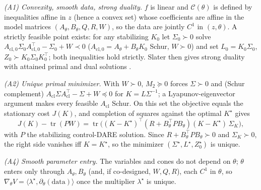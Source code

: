 \documentclass[twocolumn,amsthm]{autart}
\begin{document}
\emph{(A1) Convexity, smooth data, strong duality.} $f$ is linear and
$\mathcal C(\theta)$ is defined by inequalities affine in $z$ (hence a convex set)
whose coefficients are affine in the model matrices $(A_\theta,B_\theta,Q,R,W)$, so
the data are jointly $C^1$ in $(z,\theta)$. A strictly feasible point exists: for any
stabilizing $K_0$ let $\Sigma_0\succ0$ solve $A_{\mathrm{cl},0}\Sigma_0
A_{\mathrm{cl},0}^\top-\Sigma_0+W\prec0$ ($A_{\mathrm{cl},0}=A_\theta+B_\theta K_0$
Schur, $W\succ0$) and set $L_0=K_0\Sigma_0$, $Z_0\succ K_0\Sigma_0K_0^\top$; both
inequalities hold strictly. Slater then gives strong duality with attained primal
and dual solutions \cite{boyd2004convex}.

\emph{(A2) Unique primal minimizer.} With $W\succ0$, $M_2\succeq0$ forces
$\Sigma\succ0$ and (Schur complement) $A_{\mathrm{cl}}\Sigma A_{\mathrm{cl}}^\top-
\Sigma+W\preceq0$ for $K=L\Sigma^{-1}$; a Lyapunov-eigenvector argument makes every
feasible $A_{\mathrm{cl}}$ Schur. On this set the objective equals the stationary
cost $J(K)$, and completion of squares against the optimal $K^\star$ gives
\begin{equation}\label{eq:cos}
J(K)-\operatorname{tr}(PW)=\operatorname{tr}\!\big((K-K^\star)^\top
(R+B_\theta^\top PB_\theta)(K-K^\star)\,\Sigma_K\big),
\end{equation}
with $P$ the stabilizing control-DARE solution. Since $R+B_\theta^\top PB_\theta
\succ0$ and $\Sigma_K\succ0$, the right side vanishes iff $K=K^\star$, so the
minimizer $(\Sigma^\star,L^\star,Z_0^\star)$ is unique.

\emph{(A4) Smooth parameter entry.} The variables and cones do not depend on
$\theta$; $\theta$ enters only through $A_\theta,B_\theta$ (and, if co-designed,
$W,Q,R$), each $C^1$ in $\theta$, so $\nabla_\theta V=\langle\lambda^\star,
\partial_\theta(\text{data})\rangle$ once the multiplier $\lambda^\star$ is unique.
\end{document}
